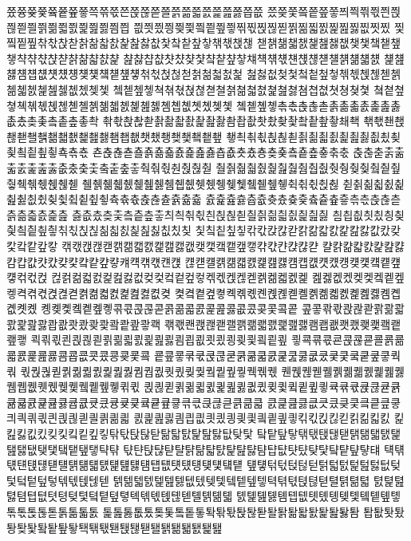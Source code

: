 쯌쯍쯎쯏쯐쯑쯒쯓쯕쯖쯗쯘쯙쯚쯛쯜쯝쯞쯟쯠쯡쯢쯣쯥쯦
쯨쯪쯫쯬쯭쯮쯯쯰쯱쯲쯳쯴쯵쯶쯷쯸쯹쯺쯻쯼쯽쯾쯿찀찁
찂찃찄찅찆찇찈찉찊찋찎찏찑찒찓찕찖찗찘찙찚찛찞찟찠
찣찤찥찦찪찫찭찯찱찲찳찴찵찶찷찺찿챀챁챂챃챆챇챉챊
챋챍챎챏챐챑챒챓챖챚챛챜챝챞챟챡챢챣챥챧챩챪챫챬챭
챮챯챱챲챳챴챶챷챸챹챺챻챼챽챾챿첀첁첂첃첄첅첆첇첈
첉첊첋첌첍첎첏첐첑첒첓첔첕첖첗첚첛첝첞첟첡첢첣첤첥
첦첧첪첮첯첰첱첲첳첶첷첹첺첻첽첾첿쳀쳁쳂쳃쳆쳈쳊쳋
쳌쳍쳎쳏쳑쳒쳓쳕쳖쳗쳘쳙쳚쳛쳜쳝쳞쳟쳠쳡쳢쳣쳥쳦쳧
쳨쳩쳪쳫쳭쳮쳯쳱쳲쳳쳴쳵쳶쳷쳸쳹쳺쳻쳼쳽쳾쳿촀촂촃
촄촅촆촇촊촋촍촎촏촑촒촓촔촕촖촗촚촜촞촟촠촡촢촣촥
촦촧촩촪촫촭촮촯촰촱촲촳촴촵촶촷촸촺촻촼촽촾촿쵀쵁
쵂쵃쵄쵅쵆쵇쵈쵉쵊쵋쵌쵍쵎쵏쵐쵑쵒쵓쵔쵕쵖쵗쵘쵙쵚
쵛쵝쵞쵟쵡쵢쵣쵥쵦쵧쵨쵩쵪쵫쵮쵰쵲쵳쵴쵵쵶쵷쵹쵺쵻
쵼쵽쵾쵿춀춁춂춃춄춅춆춇춉춊춋춌춍춎춏춐춑춒춓춖춗
춙춚춛춝춞춟춠춡춢춣춦춨춪춫춬춭춮춯춱춲춳춴춵춶춷
춸춹춺춻춼춽춾춿췀췁췂췃췅췆췇췈췉췊췋췍췎췏췑췒췓
췔췕췖췗췘췙췚췛췜췝췞췟췠췡췢췣췤췥췦췧췩췪췫췭췮
췯췱췲췳췴췵췶췷췺췼췾췿츀츁츂츃츅츆츇츉츊츋츍츎츏
츐츑츒츓츕츖츗츘츚츛츜츝츞츟츢츣츥츦츧츩츪츫츬츭츮
츯츲츴츶츷츸츹츺츻츼츽츾츿칀칁칂칃칄칅칆칇칈칉칊칋
칌칍칎칏칐칑칒칓칔칕칖칗칚칛칝칞칢칣칤칥칦칧칪칬칮
칯칰칱칲칳칶칷칹칺칻칽칾칿캀캁캂캃캆캈캊캋캌캍캎캏
캒캓캕캖캗캙캚캛캜캝캞캟캢캦캧캨캩캪캫캮캯캰캱캲캳
캴캵캶캷캸캹캺캻캼캽캾캿컀컂컃컄컅컆컇컈컉컊컋컌컍
컎컏컐컑컒컓컔컕컖컗컘컙컚컛컜컝컞컟컠컡컢컣컦컧컩
컪컭컮컯컰컱컲컳컶컺컻컼컽컾컿켂켃켅켆켇켉켊켋켌켍
켎켏켒켔켖켗켘켙켚켛켝켞켟켡켢켣켥켦켧켨켩켪켫켮켲
켳켴켵켶켷켹켺켻켼켽켾켿콀콁콂콃콄콅콆콇콈콉콊콋콌
콍콎콏콐콑콒콓콖콗콙콚콛콝콞콟콠콡콢콣콦콨콪콫콬콭
콮콯콲콳콵콶콷콹콺콻콼콽콾콿쾁쾂쾃쾄쾆쾇쾈쾉쾊쾋쾍
쾎쾏쾐쾑쾒쾓쾔쾕쾖쾗쾘쾙쾚쾛쾜쾝쾞쾟쾠쾢쾣쾤쾥쾦쾧
쾩쾪쾫쾬쾭쾮쾯쾱쾲쾳쾴쾵쾶쾷쾸쾹쾺쾻쾼쾽쾾쾿쿀쿁쿂
쿃쿅쿆쿇쿈쿉쿊쿋쿌쿍쿎쿏쿐쿑쿒쿓쿔쿕쿖쿗쿘쿙쿚쿛쿜
쿝쿞쿟쿢쿣쿥쿦쿧쿩쿪쿫쿬쿭쿮쿯쿲쿴쿶쿷쿸쿹쿺쿻쿽쿾
쿿퀁퀂퀃퀅퀆퀇퀈퀉퀊퀋퀌퀍퀎퀏퀐퀒퀓퀔퀕퀖퀗퀙퀚퀛
퀜퀝퀞퀟퀠퀡퀢퀣퀤퀥퀦퀧퀨퀩퀪퀫퀬퀮퀯퀰퀱퀲퀳퀶퀷
퀹퀺퀻퀽퀾퀿큀큁큂큃큆큈큊큋큌큍큎큏큑큒큓큕큖큗큙
큚큛큜큝큞큟큡큢큣큤큥큦큧큨큩큪큫큮큯큱큲큳큵큶큷
큸큹큺큻큾큿킀킂킃킄킅킆킇킈킉킊킋킌킍킎킏킐킑킒킓
킔킕킖킗킘킙킚킛킜킝킞킟킠킡킢킣킦킧킩킪킫킭킮킯킰
킱킲킳킶킸킺킻킼킽킾킿탂탃탅탆탇탊탋탌탍탎탏탒탖탗
탘탙탚탛탞탟탡탢탣탥탦탧탨탩탪탫탮탲탳탴탵탶탷탹탺
탻탼탽탾탿턀턁턂턃턄턅턆턇턈턉턊턋턌턎턏턐턑턒턓턔
턕턖턗턘턙턚턛턜턝턞턟턠턡턢턣턤턥턦턧턨턩턪턫턬턭
턮턯턲턳턵턶턷턹턻턼턽턾턿텂텆텇텈텉텊텋텎텏텑텒텓
텕텖텗텘텙텚텛텞텠텢텣텤텥텦텧텩텪텫텭텮텯텰텱텲텳
텴텵텶텷텸텹텺텻텽텾텿톀톁톂톃톅톆톇톉톊톋톌톍톎톏
톐톑톒톓톔톕톖톗톘톙톚톛톜톝톞톟톢톣톥톦톧톩톪톫톬
톭톮톯톲톴톶톷톸톹톻톽톾톿퇁퇂퇃퇄퇅퇆퇇퇈퇉퇊퇋퇌
퇍퇎퇏퇐퇑퇒퇓퇔퇕퇖퇗퇙퇚퇛퇜퇝퇞퇟퇠퇡퇢퇣퇤퇥퇦
